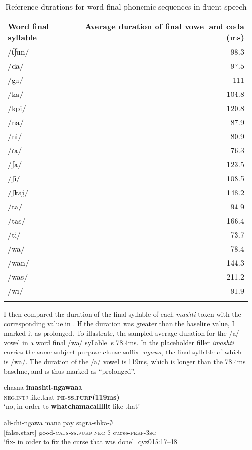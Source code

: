 \documentclass[output=paper]{langscibook}
\begin{document}
\begin{table}
\begin{tabular}{lr}
\lsptoprule
Word final syllable & Average duration of final vowel and coda (ms)\\
\midrule
/t͡ʃun/ & 98.3\\
/da/ & 97.5\\
/ga/ & 111\\
/ka/ & 104.8\\
/kpi/ & 120.8\\
/na/ & 87.9\\
/ni/ & 80.9\\
/ɾa/ & 76.3\\
/ʃa/ & 123.5\\
/ʃi/ & 108.5\\
/ʃkai̯/ & 148.2\\
/ta/ & 94.9\\
/tas/ & 166.4\\
/ti/ & 73.7\\
/wa/ & 78.4\\
/wan/ & 144.3\\
/was/ & 211.2\\
/wi/ & 91.9\\
\lspbottomrule
\end{tabular}
\caption{\label{tab:rice:9} Reference durations for word final phonemic sequences in fluent speech}
\end{table}

I then compared the duration of the final syllable of each \textit{mashti} token with the corresponding value in . If the duration was greater than the baseline value, I marked it as prolonged. To illustrate, the sampled average duration for the /a/ vowel in a word final /wa/ syllable is 78.4ms. In  the placeholder filler \textit{imashti} carries the same-subject purpose clause suffix -\textit{ngawa}, the final syllable of which is /wa/. The duration of the /a/ vowel is 119ms, which is longer than the 78.4ms baseline, and is thus marked as “prolonged”.


\ea%
\label{ex:rice:26}
\ea \label{ex:rice:26a}
 {chasna} {\textbf{imashti-ngawaaa}}\\
{\textsc{neg.intj}} {like.that} {\textbf{\textsc{ph-ss.purp}}\textbf{(119ms)}}\\
\glt ‘no, in order to \textbf{whatchamacallllit} like that’
\medskip

\ex  \label{ex:rice:26b}
 {ali-chi-ngawa} {mana} {pay} {sagra-shka-${\emptyset}$}\\
{[false.start]} {good-\textsc{caus-ss.purp}} {\textsc{neg}} {3} {curse-\textsc{perf-3sg}}\\
\glt  ‘fix- in order to fix the curse that was done’ [qvz015:17--18]
\z
\z
\end{document}
